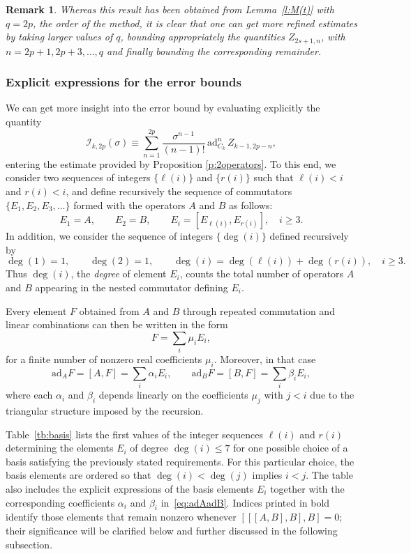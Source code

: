 \documentclass[11pt]{article}
\newcommand{\ad}{\ensuremath{\mathrm{ad}}}
\newtheorem{remark}[lemma]{Remark}
\begin{document}
\begin{remark}
  Whereas this result has been obtained from Lemma~\ref{l:M(t)} with $q=2p$, the order of the method, it is clear that one can get 
  more refined estimates by taking larger values of $q$, bounding appropriately the quantities $Z_{2s+1,n}$, with
  $n=2p+1, 2p+3, \ldots, q$ and finally bounding the corresponding remainder.
\end{remark}




\subsubsection{Explicit expressions for the error bounds}

We can get more insight into the error bound  by evaluating explicitly the quantity
\begin{equation} \label{integ_1}
  \mathcal{I}_{k,2p}(\sigma) \equiv  \sum_{n=1}^{2p} \frac{\sigma^{n-1}}{(n-1)!}\,
      \ad_{C_k}^{n}\, Z_{k-1,2p-n},
\end{equation}
entering the estimate provided by Proposition \ref{p:2operators}.
  To this end, we consider two sequences of integers $\{\ell(i)\}$ and $\{r(i)\}$ such that 
$\ell(i) < i$ and $r(i) < i$, and define recursively the sequence of commutators $\{E_1, E_2, E_3, \ldots\}$ formed with the operators
$A$ and $B$ as follows:
\[
E_1 = A, \qquad E_2 = B, \qquad 
E_i = [E_{\ell(i)}, E_{r(i)}], \quad i \ge 3.
\]
In addition, we consider the sequence of integers $\{\deg(i)\}$ defined recursively by
\[
   \deg(1) = 1,\qquad \deg(2) = 1,\qquad 
   \deg(i) = \deg(\ell(i)) + \deg(r(i)), \quad i\ge 3.
\]
Thus $\deg(i)$, the \emph{degree} of element $E_i$, counts the total number of operators $A$ and $B$ appearing in the
nested commutator defining $E_i$.  

Every element $F$ obtained from $A$ and $B$ through repeated commutation 
and linear combinations can then be written in the form
\[
   F = \sum_i \mu_i E_i,
\]
for a finite number of nonzero real coefficients $\mu_i$.  
Moreover, in that case 
\begin{equation}\label{eq:adAadB}
   \ad_A F = [A,F]= \sum_i \alpha_i E_i,
   \qquad
   \ad_B F = [B,F] = \sum_i \beta_i E_i,
\end{equation}
where each $\alpha_i$ and $\beta_i$ depends linearly on the coefficients 
$\mu_j$ with $j < i$ due to the triangular structure imposed by the recursion.

Table~\ref{tb:basis} lists the first values of the integer sequences $\ell(i)$ and $r(i)$ determining the elements $E_i$ of degree $\deg(i)\le 7$ for one possible choice of a basis satisfying the previously stated requirements. For this particular choice, the basis elements are ordered so that $\deg(i)<\deg(j)$ implies $i<j$. The table also includes the explicit expressions of the basis elements $E_i$ together with the corresponding coefficients $\alpha_i$ and $\beta_i$ in~\eqref{eq:adAadB}. Indices printed in bold identify those elements that remain nonzero whenever $[[[A,B],B],B]=0$; their significance will be clarified below and further discussed in the following subsection.
\end{document}
